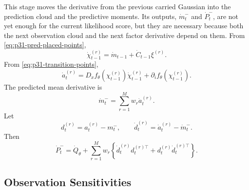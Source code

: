 \documentclass[11pt]{article}
\numberwithin{equation}{section}
\begin{document}
This stage moves the derivative from the previous carried Gaussian into the
prediction cloud and the predictive moments.  Its outputs, \(\dot m_t^-\) and
\(\dot P_t^-\), are not yet enough for the current likelihood score, but they are
necessary because both the next observation cloud and the next factor derivative
depend on them.  From \eqref{eq:p31-pred-placed-points},
\begin{equation}
  \dot\chi_{t-1}^{(r)}
  =
  \dot m_{t-1}+\dot C_{t-1}\xi^{(r)}.
  \label{eq:p31-dot-pred-place}
\end{equation}
From \eqref{eq:p31-transition-points},
\begin{equation}
  \dot a_t^{(r)}
  =
  D_xf_\theta(\chi_{t-1}^{(r)})\dot\chi_{t-1}^{(r)}
  +\partial_i f_\theta(\chi_{t-1}^{(r)}).
  \label{eq:p31-dot-transition}
\end{equation}
The predicted mean derivative is
\begin{equation}
  \dot m_t^-=\sum_{r=1}^M w_r\dot a_t^{(r)}.
  \label{eq:p31-dot-pred-mean}
\end{equation}
Let
\begin{equation}
  d_t^{(r)}=a_t^{(r)}-m_t^-,
  \qquad
  \dot d_t^{(r)}=\dot a_t^{(r)}-\dot m_t^-.
  \label{eq:p31-pred-centered}
\end{equation}
Then
\begin{equation}
  \dot P_t^-
  =
  \dot Q_\theta
  +
  \sum_{r=1}^M w_r
  \left\{
  \dot d_t^{(r)}d_t^{(r)\top}
  +d_t^{(r)}\dot d_t^{(r)\top}
  \right\}.
  \label{eq:p31-dot-pred-cov}
\end{equation}

\subsection{Observation Sensitivities}
\end{document}
